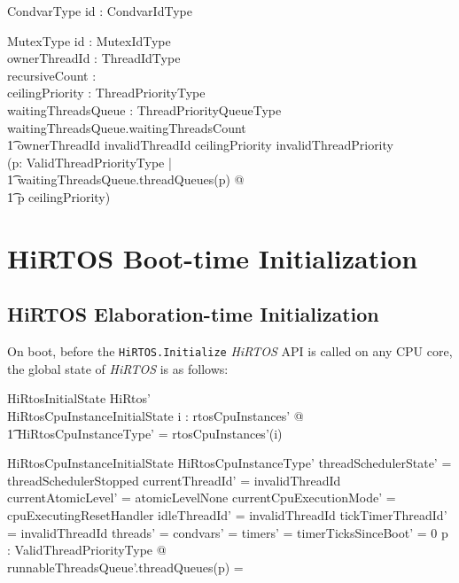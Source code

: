 \documentclass[11pt,letterpaper,twoside,openany]{book}
\begin{document}
\begin{schema}{CondvarType}
   id : CondvarIdType
\end{schema}

\begin{schema}{MutexType}
   id : MutexIdType \\
   ownerThreadId : ThreadIdType \\
   recursiveCount : \nat \\
   ceilingPriority : ThreadPriorityType \\
   waitingThreadsQueue : ThreadPriorityQueueType
\where
   waitingThreadsQueue.waitingThreadsCount  \implies \\
   \t1 ownerThreadId \neq invalidThreadId
\also
   ceilingPriority \neq invalidThreadPriority \implies \\
   (\forall p: ValidThreadPriorityType | \\
   \t1     waitingThreadsQueue.threadQueues(p) \neq \emptyset @ \\
   \t1     p \leq ceilingPriority)
\end{schema}

\section{HiRTOS Boot-time Initialization}

\subsection{HiRTOS Elaboration-time Initialization}

On boot, before the \verb`HiRTOS.Initialize` \emph{HiRTOS} API is called on any CPU core,
the global state of \emph{HiRTOS} is as follows:

\begin{schema}{HiRtosInitialState}
    HiRtos' \\
    HiRtosCpuInstanceInitialState
\where
    \forall i : \dom rtosCpuInstances' @ \\
\t1    \theta HiRtosCpuInstanceType' = rtosCpuInstances'(i)
\end{schema}

\begin{schema}{HiRtosCpuInstanceInitialState}
    HiRtosCpuInstanceType'
\where
    threadSchedulerState' = threadSchedulerStopped
\also
    currentThreadId' = invalidThreadId
\also
    currentAtomicLevel' = atomicLevelNone
\also
    currentCpuExecutionMode' = cpuExecutingResetHandler
\also
    idleThreadId' = invalidThreadId
\also
    tickTimerThreadId' = invalidThreadId
\also
    threads' = \emptyset
\also
    condvars' = \emptyset
\also
    timers' = \emptyset
\also
    timerTicksSinceBoot' = 0
\also
    \forall p : ValidThreadPriorityType @ \\
	runnableThreadsQueue'.threadQueues(p) = \emptyset
\end{schema}
\end{document}
